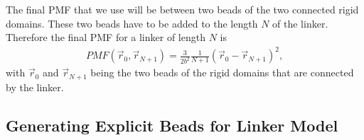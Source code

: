 \documentclass[12pt, twoside]{report}
\begin{document}
The final \gls{PMF} that we use will be between two beads of the two connected
rigid domains. These two beads have to be added to the length \(N\) of the
linker. Therefore the final \gls{PMF} for a linker of length \(N\) is
\begin{align}
  \label{eq:ch5:PMF-complexes} PMF(\vec{r}_0, \vec{r}_{N+1}) = \frac{3}{2 b^2}
\frac{1}{N+1} (\vec{r}_0 - \vec{r}_{N+1})^2,
\end{align} with \(\vec{r}_0\) and \(\vec{r}_{N+1}\) being the two beads of the
rigid domains that are connected by the linker.

\subsection{Generating Explicit Beads for Linker Model}
\end{document}
